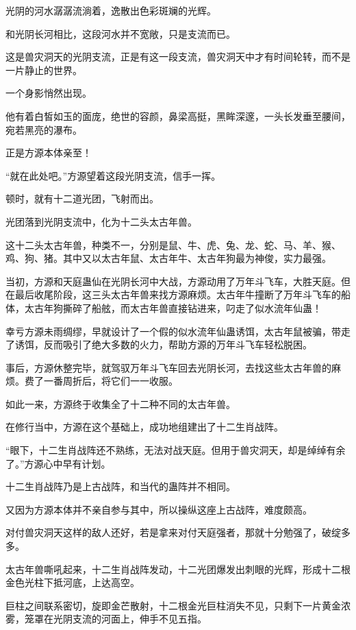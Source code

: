
\begin{this_body}

光阴的河水潺潺流淌着，逸散出色彩斑斓的光辉。

和光阴长河相比，这段河水并不宽敞，只是支流而已。

这是兽灾洞天的光阴支流，正是有这一段支流，兽灾洞天中才有时间轮转，而不是一片静止的世界。

一个身影悄然出现。

他有着白皙如玉的面庞，绝世的容颜，鼻梁高挺，黑眸深邃，一头长发垂至腰间，宛若黑亮的瀑布。

正是方源本体亲至！

“就在此处吧。”方源望着这段光阴支流，信手一挥。

顿时，就有十二道光团，飞射而出。

光团落到光阴支流中，化为十二头太古年兽。

这十二头太古年兽，种类不一，分别是鼠、牛、虎、兔、龙、蛇、马、羊、猴、鸡、狗、猪。其中又以太古年鼠、太古年牛、太古年狗最为神俊，实力最强。

当初，方源和天庭蛊仙在光阴长河中大战，方源动用了万年斗飞车，大胜天庭。但在最后收尾阶段，这三头太古年兽来找方源麻烦。太古年牛撞断了万年斗飞车的船体，太古年狗撕碎了船舷，而太古年兽直接钻进来，叼走了似水流年仙蛊！

幸亏方源未雨绸缪，早就设计了一个假的似水流年仙蛊诱饵，太古年鼠被骗，带走了诱饵，反而吸引了绝大多数的火力，帮助方源的万年斗飞车轻松脱困。

事后，方源休整完毕，就驾驭万年斗飞车回去光阴长河，去找这些太古年兽的麻烦。费了一番周折后，将它们一一收服。

如此一来，方源终于收集全了十二种不同的太古年兽。

在修行当中，方源在这个基础上，成功地组建出了十二生肖战阵。

“眼下，十二生肖战阵还不熟练，无法对战天庭。但用于兽灾洞天，却是绰绰有余了。”方源心中早有计划。

十二生肖战阵乃是上古战阵，和当代的蛊阵并不相同。

又因为方源本体并不亲自参与其中，所以操纵这座上古战阵，难度颇高。

对付兽灾洞天这样的敌人还好，若是拿来对付天庭强者，那就十分勉强了，破绽多多。

太古年兽嘶吼起来，十二生肖战阵发动，十二光团爆发出刺眼的光辉，形成十二根金色光柱下抵河底，上达高空。

巨柱之间联系密切，旋即金芒散射，十二根金光巨柱消失不见，只剩下一片黄金浓雾，笼罩在光阴支流的河面上，伸手不见五指。


\end{this_body}
